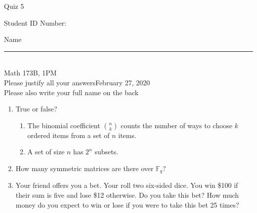 \documentclass[12pt]{article}
\begin{document}
\begin{flushleft} 
\centerline{\LARGE{Quiz 5}} 
\vspace{5 mm}
{Student ID Number:}\hfill  
{Name \rule {2 in}{0.01in}}\\
Math 173B, 1PM
\\
{Please justify all your answers}\hfill {February 27, 2020}
\\
{Please also write your full name on the back} 

\medskip
\end{flushleft}

\begin{enumerate}
	\item True or false?
	\begin{enumerate}
		\item The binomial coefficient $\binom{n}{k}$ counts the number of ways to choose $k$ ordered items from a set of $n$ items.
		\item A set of size $n$ has $2^n$ subsets.
	\end{enumerate}
	\item How many symmetric matrices are there over $\mathbb{F}_q$?
	\vfill
	\item Your friend offers you a bet. Your roll two six-sided dice. You win \$100 if their sum is five and lose \$12 otherwise. Do you take this bet? How much money do you expect to win or lose if you were to take this bet 25 times?
	\vfill
\end{enumerate}

\end{document}
